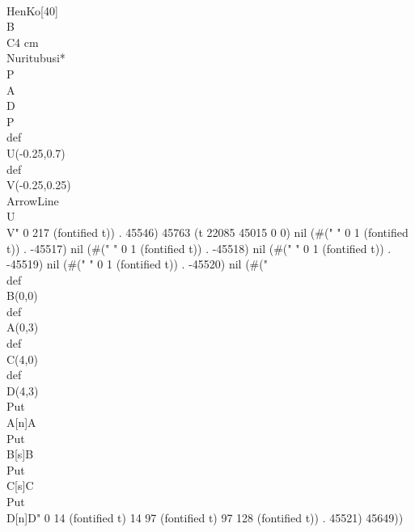    \\HenKo[40]\\B\\C{4 cm}
   \\Nuritubusi*{\\P\\A\\D\\P}
   \\def\\U{(-0.25,0.7)}
   \\def\\V{(-0.25,0.25)}
   \\ArrowLine\\U\\V" 0 217 (fontified t)) . 45546) 45763 (t 22085 45015 0 0) nil (#("
" 0 1 (fontified t)) . -45517) nil (#(" " 0 1 (fontified t)) . -45518) nil (#(" " 0 1 (fontified t)) . -45519) nil (#(" " 0 1 (fontified t)) . -45520) nil (#("\\def\\B{(0,0)}
   \\def\\A{(0,3)}
   \\def\\C{(4,0)}
   \\def\\D{(4,3)}
   \\Put\\A[n]{A}
   \\Put\\B[s]{B}
   \\Put\\C[s]{C}
   \\Put\\D[n]{D}" 0 14 (fontified t) 14 97 (fontified t) 97 128 (fontified t)) . 45521) 45649))
